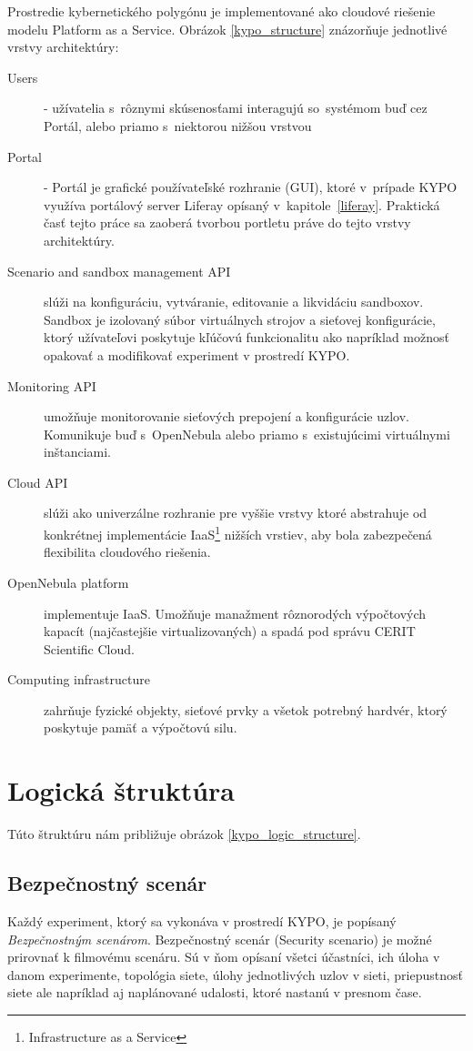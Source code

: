 \documentclass[
  digital, %
  twoside, %
  notable,   %
  nolof,   %
  nolot,   %
]{fithesis3}
\begin{document}
Prostredie kybernetického polygónu je implementované ako cloudové riešenie modelu Platform as a Service. Obrázok \ref{kypo_structure} znázorňuje jednotlivé vrstvy architektúry:

\begin{description}
\item[Users] - užívatelia s~rôznymi skúsenosťami interagujú so~systémom buď cez Portál, alebo priamo s~niektorou nižšou vrstvou
\item[Portal] - Portál je grafické používateľské rozhranie (GUI), ktoré v~prípade KYPO využíva portálový server Liferay opísaný v~kapitole~\ref{liferay}. Praktická časť tejto práce sa zaoberá tvorbou portletu práve do tejto vrstvy architektúry.
\item[Scenario and sandbox management API] slúži na konfiguráciu, vytváranie, editovanie a likvidáciu sandboxov. Sandbox je izolovaný súbor virtuálnych strojov a sieťovej konfigurácie, ktorý užívateľovi poskytuje kľúčovú funkcionalitu ako napríklad možnosť opakovať a modifikovať experiment v prostredí KYPO.
\item[Monitoring API] umožňuje monitorovanie sieťových prepojení a konfigurácie uzlov. Komunikuje buď s~OpenNebula alebo priamo s~existujúcimi virtuálnymi inštanciami.
\item[Cloud API] slúži ako univerzálne rozhranie pre vyššie vrstvy ktoré abstrahuje od konkrétnej implementácie IaaS\footnote{Infrastructure as a Service} nižších vrstiev, aby bola zabezpečená flexibilita cloudového riešenia.
\item[OpenNebula platform] implementuje IaaS\cite{sempolinski2010comparison}. Umožňuje manažment rôznorodých výpočtových kapacít (najčastejšie virtualizovaných) a spadá pod správu CERIT Scientific Cloud.
\item[Computing infrastructure] zahrňuje fyzické objekty, sieťové prvky a všetok potrebný hardvér, ktorý poskytuje pamäť a výpočtovú silu.
\end{description}

\section{Logická štruktúra}
Túto štruktúru nám približuje obrázok \ref{kypo_logic_structure}.

\subsection{Bezpečnostný scenár}
Každý experiment, ktorý sa vykonáva v prostredí KYPO, je popísaný \textit{Bezpečnostným scenárom}. Bezpečnostný scenár (Security scenario) je možné prirovnať k filmovému scenáru. Sú v ňom opísaní všetci účastníci, ich úloha v danom experimente, topológia siete, úlohy jednotlivých uzlov v sieti, priepustnosť siete ale napríklad aj naplánované udalosti, ktoré nastanú v presnom čase\cite{eichler2014analytical, eichler2015kypo}.
\end{document}
